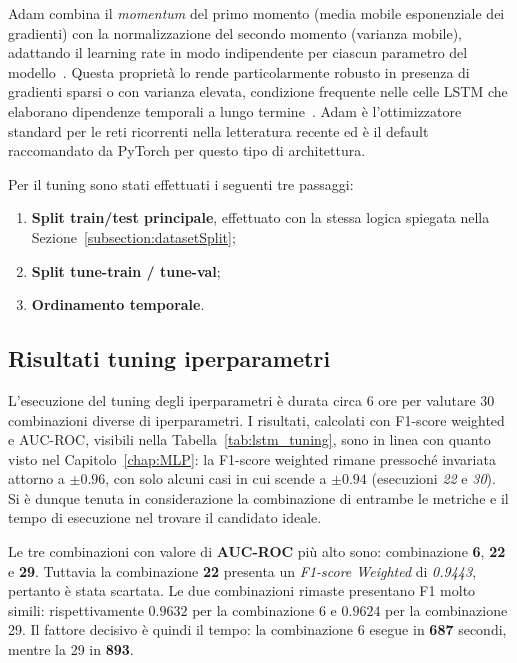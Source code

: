 \documentclass[../main.tex]{subfiles}
\begin{document}
Adam combina il \textit{momentum} del primo momento (media mobile esponenziale dei gradienti) con la normalizzazione del secondo momento (varianza mobile), adattando il learning rate in modo indipendente per ciascun parametro del modello~\cite{kingma2017adammethodstochasticoptimization}. Questa proprietà lo rende particolarmente robusto in presenza di gradienti sparsi o con varianza elevata, condizione frequente nelle celle LSTM che elaborano dipendenze temporali a lungo termine~\cite{ALSELWI2024102068}. Adam è l'ottimizzatore standard per le reti ricorrenti nella letteratura recente ed è il default raccomandato da PyTorch per questo tipo di architettura.

Per il tuning sono stati effettuati i seguenti tre passaggi:
\begin{enumerate}
\item \textbf{Split train/test principale}, effettuato con la stessa logica spiegata nella Sezione~\ref{subsection:datasetSplit};
\item \textbf{Split tune-train / tune-val};
\item \textbf{Ordinamento temporale}.
\end{enumerate}

\subsection{Risultati tuning iperparametri}
L'esecuzione del tuning degli iperparametri è durata circa 6 ore per valutare 30 combinazioni diverse di iperparametri.
I risultati, calcolati con F1-score weighted e AUC-ROC, visibili nella Tabella~\ref{tab:lstm_tuning}, sono in linea con quanto visto nel Capitolo~\ref{chap:MLP}: la F1-score weighted rimane pressoché invariata attorno a $\pm 0.96$, con solo alcuni casi in cui scende a $\pm 0.94$ (esecuzioni \textit{22} e \textit{30}). Si è dunque tenuta in considerazione la combinazione di entrambe le metriche e il tempo di esecuzione nel trovare il candidato ideale.

Le tre combinazioni con valore di \textbf{AUC-ROC} più alto sono: combinazione \textbf{6}, \textbf{22} e \textbf{29}. Tuttavia la combinazione \textbf{22} presenta un \textit{F1-score Weighted} di \textit{0.9443}, pertanto è stata scartata. Le due combinazioni rimaste presentano F1 molto simili: rispettivamente $0.9632$ per la combinazione 6 e $0.9624$ per la combinazione 29.
Il fattore decisivo è quindi il tempo: la combinazione 6 esegue in \textbf{687} secondi, mentre la 29 in \textbf{893}.
\end{document}

